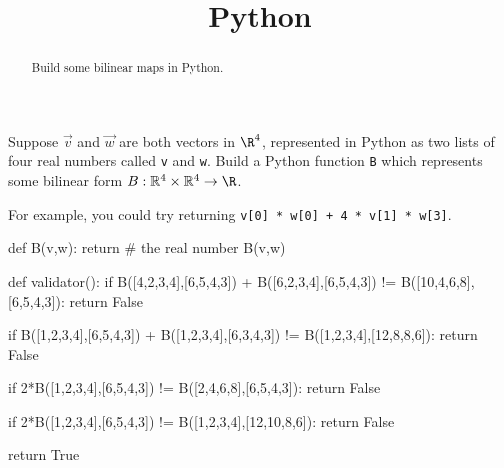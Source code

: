 \documentclass{ximera}
\title{Python}
\begin{document}
\begin{abstract}
  Build some bilinear maps in Python.
\end{abstract}	

\begin{question}
  Suppose $\vec{v}$ and $\vec{w}$ are both vectors in $\R^4$, represented in Python as two lists of four real numbers called \texttt{v} and \texttt{w}.  Build a Python function \texttt{B} which represents some bilinear form $B : \mathbb{R}^4 \times \mathbb{R}^4 \to \R$.

  \begin{solution}
    \begin{hint}
      For example, you could try returning \texttt{v[0] * w[0] + 4 * v[1] * w[3]}.
    \end{hint}
    \begin{python}
def B(v,w):
  return # the real number B(v,w)

def validator():
  if B([4,2,3,4],[6,5,4,3]) + B([6,2,3,4],[6,5,4,3]) != B([10,4,6,8],[6,5,4,3]):
    return False

  if B([1,2,3,4],[6,5,4,3]) + B([1,2,3,4],[6,3,4,3]) != B([1,2,3,4],[12,8,8,6]):
    return False

  if 2*B([1,2,3,4],[6,5,4,3]) != B([2,4,6,8],[6,5,4,3]):
    return False

  if 2*B([1,2,3,4],[6,5,4,3]) != B([1,2,3,4],[12,10,8,6]):
    return False

  return True
    \end{python}
  \end{solution}


\end{question}
\end{document}
